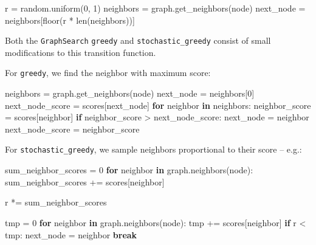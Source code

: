 \documentclass[10pt,oneside]{memoir}
\newenvironment{Shaded}{}{}
\newcommand{\BuiltInTok}[1]{#1}
\newcommand{\ControlFlowTok}[1]{\textcolor[rgb]{0.00,0.44,0.13}{\textbf{#1}}}
\newcommand{\DecValTok}[1]{\textcolor[rgb]{0.25,0.63,0.44}{#1}}
\newcommand{\KeywordTok}[1]{\textcolor[rgb]{0.00,0.44,0.13}{\textbf{#1}}}
\newcommand{\NormalTok}[1]{#1}
\newcommand{\OperatorTok}[1]{\textcolor[rgb]{0.40,0.40,0.40}{#1}}
\begin{document}
\begin{Shaded}
\begin{Highlighting}[]
\NormalTok{r }\OperatorTok{=}\NormalTok{ random.uniform(}\DecValTok{0}\NormalTok{, }\DecValTok{1}\NormalTok{)}
\NormalTok{neighbors }\OperatorTok{=}\NormalTok{ graph.get_neighbors(node)}
\NormalTok{next_node }\OperatorTok{=}\NormalTok{ neighbors[floor(r }\OperatorTok{*} \BuiltInTok{len}\NormalTok{(neighbors))]}
\end{Highlighting}
\end{Shaded}

Both the \texttt{GraphSearch} \texttt{greedy} and
\texttt{stochastic\_greedy} consist of small modifications to this
transition function.

For \texttt{greedy}, we find the neighbor with maximum score:

\begin{Shaded}
\begin{Highlighting}[]
\NormalTok{neighbors }\OperatorTok{=}\NormalTok{ graph.get_neighbors(node)}
\NormalTok{next_node }\OperatorTok{=}\NormalTok{ neighbors[}\DecValTok{0}\NormalTok{]}
\NormalTok{next_node_score }\OperatorTok{=}\NormalTok{ scores[next_node]}
\ControlFlowTok{for}\NormalTok{ neighbor }\KeywordTok{in}\NormalTok{ neighbors:}
\NormalTok{    neighbor_score }\OperatorTok{=}\NormalTok{ scores[neighbor]}
    \ControlFlowTok{if}\NormalTok{ neighbor_score }\OperatorTok{>}\NormalTok{ next_node_score:}
\NormalTok{        next_node }\OperatorTok{=}\NormalTok{ neighbor}
\NormalTok{        next_node_score }\OperatorTok{=}\NormalTok{ neighbor_score}
\end{Highlighting}
\end{Shaded}

For \texttt{stochastic\_greedy}, we sample neighbors proportional to
their score -- e.g.:

\begin{Shaded}
\begin{Highlighting}[]
\NormalTok{sum_neighbor_scores }\OperatorTok{=} \DecValTok{0}
\ControlFlowTok{for}\NormalTok{ neighbor }\KeywordTok{in}\NormalTok{ graph.neighbors(node):}
\NormalTok{   sum_neighbor_scores }\OperatorTok{+=}\NormalTok{ scores[neighbor]}

\NormalTok{r }\OperatorTok{*=}\NormalTok{ sum_neighbor_scores}

\NormalTok{tmp }\OperatorTok{=} \DecValTok{0}
\ControlFlowTok{for}\NormalTok{ neighbor }\KeywordTok{in}\NormalTok{ graph.neighbors(node):}
\NormalTok{   tmp }\OperatorTok{+=}\NormalTok{ scores[neighbor]}
   \ControlFlowTok{if}\NormalTok{ r }\OperatorTok{<}\NormalTok{ tmp:}
\NormalTok{       next_node }\OperatorTok{=}\NormalTok{ neighbor}
       \ControlFlowTok{break}
\end{Highlighting}
\end{Shaded}
\end{document}
